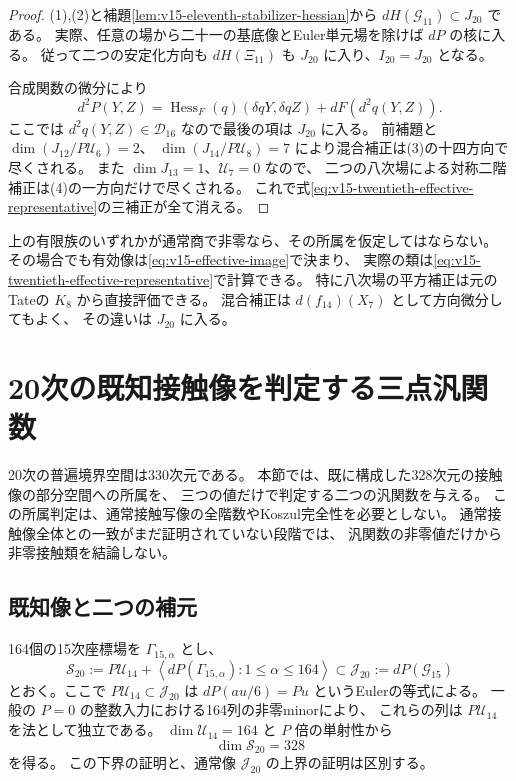 \begin{proof}
(1),(2)と補題\ref{lem:v15-eleventh-stabilizer-hessian}から
$dH(\mathcal G_{11})\subset J_{20}$ である。
実際、任意の場から二十一の基底像とEuler単元場を除けば $dP$ の核に入る。
従って二つの安定化方向も $dH(\Xi_{11})$ も $J_{20}$ に入り、$I_{20}=J_{20}$ となる。

合成関数の微分により
\[
 d^2P(Y,Z)=\operatorname{Hess}_F(q)(\delta qY,\delta qZ)
                      +dF(d^2q(Y,Z)).
\]
ここでは $d^2q(Y,Z)\in\mathcal D_{16}$ なので最後の項は $J_{20}$ に入る。
前補題と $\dim(J_{12}/P\mathcal U_6)=2$、
$\dim(J_{14}/P\mathcal U_8)=7$ により混合補正は(3)の十四方向で尽くされる。
また $\dim J_{13}=1$、$\mathcal U_7=0$ なので、
二つの八次場による対称二階補正は(4)の一方向だけで尽くされる。
これで式\eqref{eq:v15-twentieth-effective-representative}の三補正が全て消える。
\end{proof}

\begin{remark}[判定が零でない場合]
上の有限族のいずれかが通常商で非零なら、その所属を仮定してはならない。
その場合でも有効像は\eqref{eq:v15-effective-image}で決まり、
実際の類は\eqref{eq:v15-twentieth-effective-representative}で計算できる。
特に八次場の平方補正は元のTateの $K_8$ から直接評価できる。
混合補正は $d(f_{14})(X_7)$ として方向微分してもよく、
その違いは $J_{20}$ に入る。
\end{remark}



\section{20次の既知接触像を判定する三点汎関数}
\label{sec:v15-three-point-detectors}

20次の普遍境界空間は330次元である。
本節では、既に構成した328次元の接触像の部分空間への所属を、
三つの値だけで判定する二つの汎関数を与える。
この所属判定は、通常接触写像の全階数やKoszul完全性を必要としない。
通常接触像全体との一致がまだ証明されていない段階では、
汎関数の非零値だけから非零接触類を結論しない。

\subsection{既知像と二つの補元}

164個の15次座標場を $\Gamma_{15,\alpha}$ とし、
\[
 \mathcal S_{20}:=
 P\mathcal U_{14}
 +\left\langle dP(\Gamma_{15,\alpha}):1\le\alpha\le164\right\rangle
 \subset\mathcal J_{20}:=dP(\mathcal G_{15})
\]
とおく。ここで $P\mathcal U_{14}\subset\mathcal J_{20}$ は
$dP(a u/6)=Pu$ というEulerの等式による。
一般の $P=0$ の整数入力における164列の非零minorにより、
これらの列は $P\mathcal U_{14}$ を法として独立である。
$\dim\mathcal U_{14}=164$ と $P$ 倍の単射性から
\begin{equation}\label{eq:v15-known-image-dimension}
 \dim\mathcal S_{20}=328
\end{equation}
を得る。
この下界の証明と、通常像 $\mathcal J_{20}$ の上界の証明は区別する。


